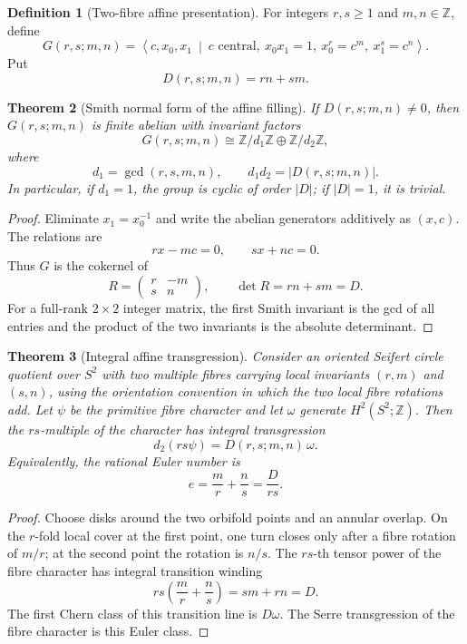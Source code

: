 \documentclass[11pt]{article}
\newtheorem{theorem}{Theorem}[section]
\theoremstyle{definition}
\newtheorem{definition}[theorem]{Definition}
\theoremstyle{remark}
\newcommand{\ZZ}{\mathbb Z}
\newcommand{\1}{\mathbf 1}
\begin{document}
\begin{definition}[Two-fibre affine presentation]
For integers $r,s\geq1$ and $m,n\in\ZZ$, define
\[
G(r,s;m,n)
=
\left\langle c,x_0,x_1\ \middle|\
 c\text{ central},\ x_0x_1=1,\ x_0^r=c^m,\ x_1^s=c^n
\right\rangle.
\]
Put
\[
D(r,s;m,n)=rn+sm.
\]
\end{definition}

\begin{theorem}[Smith normal form of the affine filling]
If $D(r,s;m,n)\neq0$, then $G(r,s;m,n)$ is finite abelian with invariant factors
\[
G(r,s;m,n)
\cong
\ZZ/d_1\ZZ\oplus\ZZ/d_2\ZZ,
\]
where
\[
d_1=\gcd(r,s,m,n),
\qquad
d_1d_2=|D(r,s;m,n)|.
\]
In particular, if $d_1=1$, the group is cyclic of order $|D|$; if $|D|=1$, it is trivial.
\end{theorem}

\begin{proof}
Eliminate $x_1=x_0^{-1}$ and write the abelian generators additively as $(x,c)$.  The relations are
\[
rx-mc=0,
\qquad
sx+nc=0.
\]
Thus $G$ is the cokernel of
\[
R=
\begin{pmatrix}
r&-m\\
s&n
\end{pmatrix},
\qquad
\det R=rn+sm=D.
\]
For a full-rank $2\times2$ integer matrix, the first Smith invariant is the gcd of all entries and the product of the two invariants is the absolute determinant.
\end{proof}

\begin{theorem}[Integral affine transgression]
Consider an oriented Seifert circle quotient over $S^2$ with two multiple fibres carrying local invariants $(r,m)$ and $(s,n)$, using the orientation convention in which the two local fibre rotations add.  Let $\psi$ be the primitive fibre character and let $\omega$ generate $H^2(S^2;\ZZ)$.  Then the $rs$-multiple of the character has integral transgression
\[
d_2(rs\psi)=D(r,s;m,n)\,\omega.
\tag{10.1}
\]
Equivalently, the rational Euler number is
\[
e=\frac mr+\frac ns=\frac{D}{rs}.
\]
\end{theorem}

\begin{proof}
Choose disks around the two orbifold points and an annular overlap.  On the $r$-fold local cover at the first point, one turn closes only after a fibre rotation of $m/r$; at the second point the rotation is $n/s$.  The $rs$-th tensor power of the fibre character has integral transition winding
\[
rs\left(\frac mr+\frac ns\right)=sm+rn=D.
\]
The first Chern class of this transition line is $D\omega$.  The Serre transgression of the fibre character is this Euler class.
\end{proof}
\end{document}
